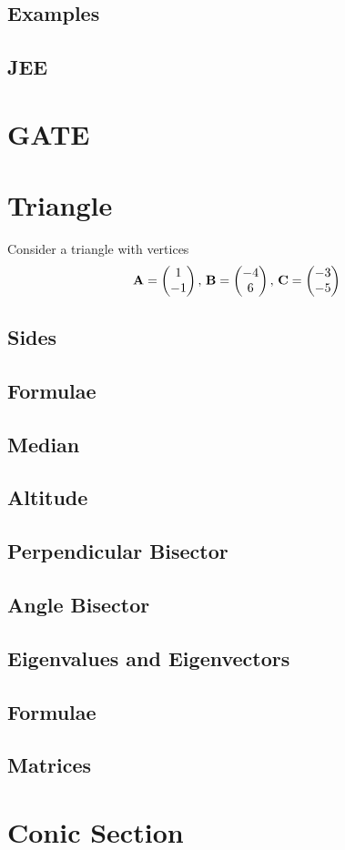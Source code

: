 \documentclass[journal]{IEEEtran}
\begin{document}
\subsection{Examples}

\subsection{JEE}
 
\newpage
\section{GATE}

\newpage
\appendices
\section{Triangle}
Consider a triangle with vertices
		\begin{align}
			\label{eq:app-tri-pts}
			\mathbf{A} = \begin{pmatrix}1 \\ -1\end{pmatrix},\,
			\mathbf{B} = \begin{pmatrix}-4 \\ 6\end{pmatrix},\,
			\mathbf{C} = \begin{pmatrix}-3 \\ -5\end{pmatrix}
		\end{align}
\subsection{Sides}

\subsection{Formulae}

\subsection{Median}

\subsection{Altitude}

\subsection{Perpendicular Bisector}

\subsection{Angle Bisector}

\subsection{Eigenvalues and Eigenvectors}

\subsection{Formulae}

\subsection{Matrices}

\newpage
\section{Conic Section}

\fi
\end{document}
